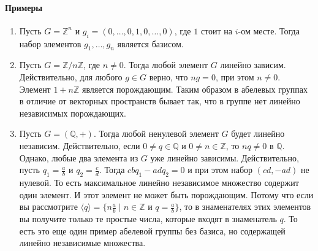 \paragraph{Примеры}

\begin{enumerate}
\item Пусть $G = \mathbb Z^n$ и $g_i = (0,\ldots, 0,1,0,\ldots,0)$, где $1$ стоит на $i$-ом месте.
Тогда набор элементов $g_1,\ldots, g_n$ является базисом.

\item Пусть $G = \mathbb Z/n\mathbb Z$, где $n \neq 0$.
Тогда любой элемент $G$ линейно зависим.
Действительно, для любого $g\in G$ верно, что $n g = 0$, при этом $n \neq 0$.
Элемент $1 + n\mathbb Z$ является порождающим.
Таким образом в абелевых группах в отличие от векторных пространств бывает так, что в группе нет линейно независимых порождающих.

\item Пусть $G = (\mathbb Q, + )$.
Тогда любой ненулевой элемент $G$ будет линейно независим.
Действительно, если $0\neq q \in \mathbb Q$ и $0 \neq n \in \mathbb Z$, то $n q \neq 0 $  в $\mathbb Q$.
Однако, любые два элемента из $G$ уже линейно зависимы.
Действительно, пусть $q_1 = \frac{a}{b}$ и $q_2 = \frac{c}{d}$.
Тогда $cb q_1 - ad q_2 = 0$ и при этом набор $(cd, -ad)$ не нулевой.
То есть максимальное линейно независимое множество содержит один элемент.
И этот элемент не может быть порождающим.
Потому что если вы рассмотрите $\langle q\rangle = \{n \frac{a}{b} \mid n\in \mathbb Z \text{ и }q = \frac{a}{b}\}$, то в знаменателях этих элементов вы получите только те простые числа, которые входят в знаменатель $q$.
То есть это еще один пример абелевой группы без базиса, но содержащей линейно независимые множества.
\end{enumerate}

